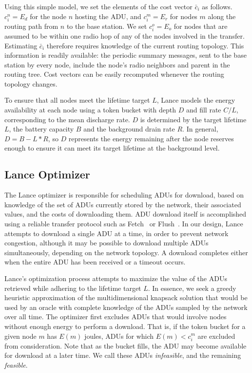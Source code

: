 Using this simple model, we set the elements of the cost vector $\bar{c}_i$
as follows. $c_i^n = E_d$ for the node $n$ hosting the ADU, and $c_i^m = E_r$
for nodes $m$ along the routing path from $n$ to the base station. We set
$c_i^o = E_o$ for nodes that are assumed to be within one radio hop of any of
the nodes involved in the transfer. Estimating $\bar{c}_i$ therefore requires
knowledge of the current routing topology. This information is readily
available: the periodic summary messages, sent to the base station by every
node, include the node's radio neighbors and parent in the routing tree. Cost
vectors can be easily recomputed whenever the routing topology changes.

To ensure that all nodes meet the lifetime target $L$, Lance models the
energy availability at each node using a token bucket with depth $D$ and fill
rate $C/L$, corresponding to the mean discharge rate. $D$ is determined by
the target lifetime $L$, the battery capacity $B$ and the background drain
rate $R$. In general, $D = B - L*R$, so $D$ represents the energy remaining
after the node reserves enough to ensure it can meet its target lifetime at
the background level.

\subsection{Lance Optimizer}
\label{lance-subsec-optimizer}

The Lance optimizer is responsible for scheduling ADUs for download, based on
knowledge of the set of ADUs currently stored by the network, their
associated values, and the costs of downloading them. ADU download itself is
accomplished using a reliable transfer protocol such as
Fetch~\cite{volcano-osdi06} or Flush~\cite{flush-sensys07}. In our design,
Lance attempts to download a single ADU at a time, in order to prevent
network congestion, although it may be possible to download multiple ADUs
simultaneously, depending on the network topology. A download completes
either when the entire ADU has been received or a timeout occurs.

Lance's optimization process attempts to maximize the value of the ADUs
retrieved while adhering to the lifetime target $L$. In essence, we seek a
greedy heuristic approximation of the multidimensional knapsack solution that
would be used by an oracle with complete knowledge of the ADUs sampled by the
network over all time. The optimizer first excludes ADUs that would involve
nodes without enough energy to perform a download. That is, if the token
bucket for a given node $m$ has $E(m)$ joules, ADUs for which $E(m) < c_i^m$
are excluded from consideration. Note that as the bucket fills, the ADU may
become available for download at a later time. We call these ADUs
\textit{infeasible}, and the remaining \textit{feasible}.

